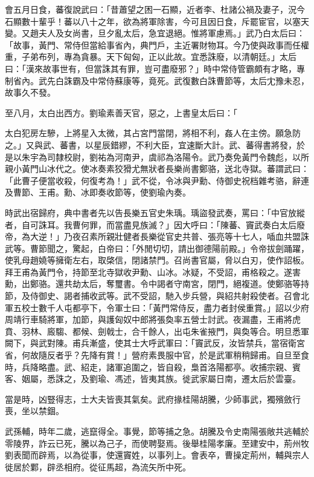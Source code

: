 \begin{pinyinscope}
會五月日食，蕃復說武曰：「昔蕭望之困一石顯，近者李、杜諸公禍及妻子，況今石顯數十輩乎！蕃以八十之年，欲為將軍除害，今可且因日食，斥罷宦官，以塞天變。又趙夫人及女尚書，旦夕亂太后，急宜退絕。惟將軍慮焉。」武乃白太后曰：「故事，黃門、常侍但當給事省內，典門戶，主近署財物耳。今乃使與政事而任權重，子弟布列，專為貪暴。天下匈匈，正以此故。宜悉誅廢，以清朝廷。」太后曰：「漢來故事世有，但當誅其有罪，豈可盡廢邪？」時中常侍管霸頗有才略，專制省內。武先白誅霸及中常侍蘇康等，竟死。武復數白誅曹節等，太后冘豫未忍，故事久不發。

至八月，太白出西方。劉瑜素善天官，惡之，上書皇太后曰：「

太白犯房左驂，上將星入太微，其占宮門當閉，將相不利，姦人在主傍。願急防之。」又與武、蕃書，以星辰錯繆，不利大臣，宜速斷大計。武、蕃得書將發，於是以朱宇為司隸校尉，劉祐為河南尹，虞祁為洛陽令。武乃奏免黃門令魏彪，以所親小黃門山冰代之。使冰奏素狡猾尤無狀者長樂尚書鄭骆，送北寺獄。蕃謂武曰：「此曹子便當收殺，何復考為！」武不從，令冰與尹勳、侍御史祝档雜考骆，辭連及曹節、王甫。勳、冰即奏收節等，使劉瑜內奏。

時武出宿歸府，典中書者先以告長樂五官史朱瑀。瑀盜發武奏，罵曰：「中官放縱者，自可誅耳。我曹何罪，而當盡見族滅？」因大呼曰：「陳蕃、竇武奏白太后廢帝，為大逆！」乃夜召素所親壯健者長樂從官史共普、張亮等十七人，喢血共盟誅武等。曹節聞之，驚起，白帝曰：「外閒切切，請出御德陽前殿。」令帝拔劍踊躍，使乳母趙嬈等擁衛左右，取棨信，閉諸禁門。召尚書官屬，脅以白刃，使作詔板。拜王甫為黃門令，持節至北寺獄收尹勳、山冰。冰疑，不受詔，甫格殺之。遂害勳，出鄭骆。還共劫太后，奪璽書。令中謁者守南宮，閉門，絕複道。使鄭骆等持節，及侍御史、謁者捕收武等。武不受詔，馳入步兵營，與紹共射殺使者。召會北軍五校士數千人屯都亭下，令軍士曰：「黃門常侍反，盡力者封侯重賞。」詔以少府周靖行車騎將軍，加節，與護匈奴中郎將張奐率五營士討武。夜漏盡，王甫將虎賁、羽林、廄騶、都候、劍戟士，合千餘人，出屯朱雀掖門，與奐等合。明旦悉軍闕下，與武對陳。甫兵漸盛，使其士大呼武軍曰：「竇武反，汝皆禁兵，當宿衛宮省，何故隨反者乎？先降有賞！」營府素畏服中官，於是武軍稍稍歸甫。自旦至食時，兵降略盡。武、紹走，諸軍追圍之，皆自殺，梟首洛陽都亭。收捕宗親、賓客、姻屬，悉誅之，及劉瑜、馮述，皆夷其族。徙武家屬日南，遷太后於雲臺。

當是時，凶豎得志，士大夫皆喪其氣矣。武府掾桂陽胡騰，少師事武，獨殯斂行喪，坐以禁錮。

武孫輔，時年二歲，逃竄得全。事覺，節等捕之急。胡騰及令史南陽張敞共逃輔於零陵界，詐云已死，騰以為己子，而使聘娶焉。後舉桂陽孝廉。至建安中，荊州牧劉表聞而辟焉，以為從事，使還竇姓，以事列上。會表卒，曹操定荊州，輔與宗人徙居於鄴，辟丞相府。從征馬超，為流矢所中死。


\end{pinyinscope}
